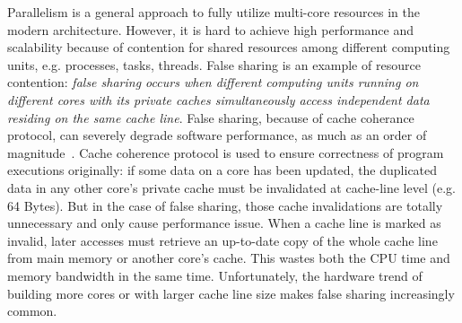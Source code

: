 
\label{sec:intro} 

Parallelism is a general approach to fully utilize multi-core resources in the modern architecture. 
However, it is hard to achieve high performance and scalability because of contention for 
shared resources among different computing units, e.g. processes, tasks, threads.
False sharing is an example of resource contention: {\it false sharing occurs when 
different computing units running on different cores with its private caches 
simultaneously access independent data residing on the same cache line}.
False sharing, because of cache coherance protocol, can severely degrade software 
performance, as much as an order of magnitude~\cite{falseshareeffect}.
Cache coherence protocol is used to ensure correctness of program executions originally: 
if some data on a core has been updated, the duplicated data in any other core's private 
cache must be invalidated at cache-line level (e.g. 64 Bytes). 
But in the case of false sharing, those cache invalidations are totally unnecessary and only
cause performance issue. 
When a cache line is marked as invalid, 
later accesses must retrieve an up-to-date copy of the whole cache line 
from main memory or another core's cache.
This wastes both the CPU time and memory bandwidth in the same time. 
Unfortunately, the hardware trend of building more cores
or with larger cache line size makes false sharing increasingly common.

